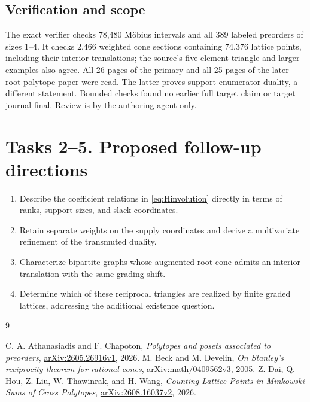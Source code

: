 \documentclass[11pt]{article}
\begin{document}
\subsection*{Verification and scope}
The exact verifier checks 78,480 M\"obius intervals and all 389
labeled preorders of sizes 1--4. It checks 2,466 weighted cone sections
containing 74,376 lattice points, including their interior translations;
the source's five-element triangle and larger examples also agree.
All 26 pages of the primary and all 25 pages of the later root-polytope
paper were read. The latter proves support-enumerator duality, a
different statement. Bounded checks found no earlier full target claim
or target journal final. Review is by the authoring agent only.

\section*{Tasks 2--5. Proposed follow-up directions}
\begin{enumerate}[label=\textbf{Task \arabic*.},start=2,leftmargin=*]
\item Describe the coefficient relations in \eqref{eq:Hinvolution}
directly in terms of ranks, support sizes, and slack coordinates.
\item Retain separate weights on the supply coordinates and derive
a multivariate refinement of the transmuted duality.
\item Characterize bipartite graphs whose augmented root cone admits
an interior translation with the same grading shift.
\item Determine which of these reciprocal triangles are realized by
finite graded lattices, addressing the additional existence question.
\end{enumerate}
\begin{thebibliography}{9}
\raggedright
{} C. A. Athanasiadis and F. Chapoton,
\emph{Polytopes and posets associated to preorders},
\href{https://arxiv.org/abs/2605.26916v1}{arXiv:2605.26916v1}, 2026.
 M. Beck and M. Develin,
\emph{On Stanley's reciprocity theorem for rational cones},
\href{https://arxiv.org/abs/math/0409562v3}{arXiv:math/0409562v3}, 2005.
 Z. Dai, Q. Hou, Z. Liu, W. Thawinrak, and H. Wang,
\emph{Counting Lattice Points in Minkowski Sums of Cross Polytopes},
\href{https://arxiv.org/abs/2608.16037v2}{arXiv:2608.16037v2}, 2026.
\end{thebibliography}
\end{document}
